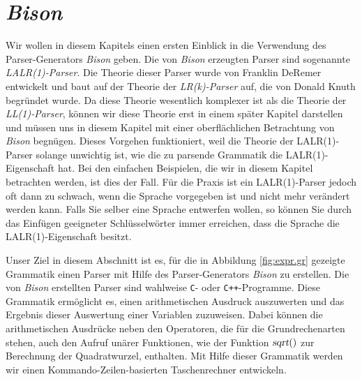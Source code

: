 \chapter{\textsl{Bison}}
Wir wollen in diesem Kapitels einen ersten Einblick in die Verwendung
des Parser-Generators \textsl{Bison} geben.  Die von \textsl{Bison} erzeugten Parser sind
sogenannte \emph{LALR(1)-Parser}.  Die Theorie dieser Parser wurde von Franklin DeRemer
\cite{deRemer:71,deRemer:82} entwickelt und baut auf der Theorie der \emph{LR(k)-Parser}
auf, die von Donald Knuth \cite{knuth:65} begr\"undet wurde.  Da diese Theorie wesentlich
komplexer ist als die Theorie der \emph{LL(1)-Parser}, k\"onnen wir diese Theorie erst in
einem sp\"ater Kapitel darstellen und m\"ussen uns in diesem Kapitel mit einer
oberfl\"achlichen Betrachtung von \textsl{Bison} begn\"ugen.  Dieses Vorgehen funktioniert,
weil die Theorie der LALR(1)-Parser solange unwichtig ist, wie die zu parsende Grammatik die
LALR(1)-Eigenschaft hat.  Bei den einfachen Beispielen, die wir in diesem Kapitel
betrachten werden, ist dies der Fall.  F\"ur die Praxis ist ein LALR(1)-Parser jedoch oft
dann zu schwach, wenn die Sprache vorgegeben ist und nicht mehr ver\"andert werden kann.
Falls Sie selber eine Sprache entwerfen wollen, so k\"onnen Sie durch das Einf\"ugen geeigneter
Schl\"usselw\"orter immer erreichen, dass die Sprache die LALR(1)-Eigenschaft besitzt.

Unser Ziel in diesem Abschnitt ist es, f\"ur die in Abbildung \ref{fig:expr.gr}
gezeigte Grammatik einen Parser mit Hilfe des Parser-Generators \textsl{Bison} zu
erstellen.  Die von \textsl{Bison} erstellten Parser sind wahlweise \texttt{C}- oder
\texttt{C++}-Programme.  
Diese Grammatik erm\"oglicht es, einen arithmetischen Ausdruck auszuwerten und das
Ergebnis dieser Auswertung einer Variablen zuzuweisen.  Dabei k\"onnen die
arithmetischen Ausdr\"ucke neben den Operatoren, die f\"ur die Grundrechenarten stehen,
auch den Aufruf un\"arer Funktionen, wie der Funktion $\textsl{sqrt}()$ zur Berechnung
der Quadratwurzel, enthalten.  Mit Hilfe dieser Grammatik werden wir einen
Kommando-Zeilen-basierten Taschenrechner entwickeln.


